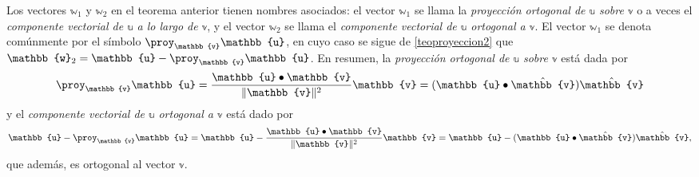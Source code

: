 Los vectores $\mathbb{w}_1$ y $\mathbb{w}_2$ en el teorema anterior tienen nombres asociados: el vector $\mathbb{w}_1$ se llama la \emph{proyección ortogonal de $\mathbb{u}$ sobre $\mathbb{v}$} o a veces el \emph{componente vectorial de $\mathbb{u}$ a lo largo de $\mathbb{v}$}, y el vector $\mathbb{w}_2$ se llama el \emph{componente vectorial de $\mathbb{u}$ ortogonal a $\mathbb{v}$}. El vector $\mathbb{w}_1$ se denota comúnmente por el símbolo $\proy_{\mathbb{v}}\mathbb{u}$, en cuyo caso se sigue de \eqref{teoproyeccion2} que $\mathbb{w}_2 = \mathbb{u} - \proy_{\mathbb{v}}\mathbb{u}$. En resumen, la \emph{proyección ortogonal de $\mathbb{u}$ sobre $\mathbb{v}$} está dada por
\begin{equation}
    \proy_{\mathbb{v}}\mathbb{u} = \frac{\mathbb{u} \bullet \mathbb{v}}{\|\mathbb{v}\|^2}\mathbb{v} = (\mathbb{u} \bullet \hat{\mathbb{v}})\hat{\mathbb{v}} \label{eq:defproyeccionvu}
\end{equation}
y el \emph{componente vectorial de $\mathbb{u}$ ortogonal a $\mathbb{v}$} está dado por
\begin{equation}
    \mathbb{u} - \proy_{\mathbb{v}}\mathbb{u} = \mathbb{u} - \frac{\mathbb{u} \bullet \mathbb{v}}{\|\mathbb{v}\|^2}\mathbb{v} = \mathbb{u} - (\mathbb{u} \bullet \hat{\mathbb{v}})\hat{\mathbb{v}},
\end{equation}
que además, es ortogonal al vector $\mathbb{v}$.

\newpage
{}

